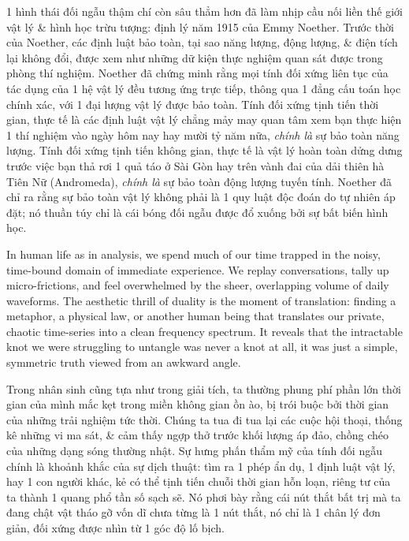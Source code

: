 \documentclass[11pt]{article}
\begin{document}
1 hình thái đối ngẫu thậm chí còn sâu thẳm hơn đã làm nhịp cầu nối liền thế giới vật lý \& hình học trừu tượng: định lý năm 1915 của Emmy Noether. Trước thời của Noether, các định luật bảo toàn, tại sao năng lượng, động lượng, \& điện tích lại không đổi, được xem như những dữ kiện thực nghiệm quan sát được trong phòng thí nghiệm. Noether đã chứng minh rằng mọi tính đối xứng liên tục của tác dụng của 1 hệ vật lý đều tương ứng trực tiếp, thông qua 1 đẳng cấu toán học chính xác, với 1 đại lượng vật lý được bảo toàn. Tính đối xứng tịnh tiến thời gian, thực tế là các định luật vật lý chẳng mảy may quan tâm xem bạn thực hiện 1 thí nghiệm vào ngày hôm nay hay mười tỷ năm nữa, \textit{chính là} sự bảo toàn năng lượng. Tính đối xứng tịnh tiến không gian, thực tế là vật lý hoàn toàn dửng dưng trước việc bạn thả rơi 1 quả táo ở Sài Gòn hay trên vành đai của dải thiên hà Tiên Nữ (Andromeda), \textit{chính là} sự bảo toàn động lượng tuyến tính. Noether đã chỉ ra rằng sự bảo toàn vật lý không phải là 1 quy luật độc đoán do tự nhiên áp đặt; nó thuần túy chỉ là cái bóng đối ngẫu được đổ xuống bởi sự bất biến hình học.

In human life as in analysis, we spend much of our time trapped in the noisy, time-bound domain of immediate experience. We replay conversations, tally up micro-frictions, and feel overwhelmed by the sheer, overlapping volume of daily waveforms. The aesthetic thrill of duality is the moment of translation: finding a metaphor, a physical law, or another human being that translates our private, chaotic time-series into a clean frequency spectrum. It reveals that the intractable knot we were struggling to untangle was never a knot at all, it was just a simple, symmetric truth viewed from an awkward angle.

Trong nhân sinh cũng tựa như trong giải tích, ta thường phung phí phần lớn thời gian của mình mắc kẹt trong miền không gian ồn ào, bị trói buộc bởi thời gian của những trải nghiệm tức thời. Chúng ta tua đi tua lại các cuộc hội thoại, thống kê những vi ma sát, \& cảm thấy ngợp thở trước khối lượng áp đảo, chồng chéo của những dạng sóng thường nhật. Sự hưng phấn thẩm mỹ của tính đối ngẫu chính là khoảnh khắc của sự dịch thuật: tìm ra 1 phép ẩn dụ, 1 định luật vật lý, hay 1 con người khác, kẻ có thể tịnh tiến chuỗi thời gian hỗn loạn, riêng tư của ta thành 1 quang phổ tần số sạch sẽ. Nó phơi bày rằng cái nút thắt bất trị mà ta đang chật vật tháo gỡ vốn dĩ chưa từng là 1 nút thắt, nó chỉ là 1 chân lý đơn giản, đối xứng được nhìn từ 1 góc độ lố bịch.
\end{document}
